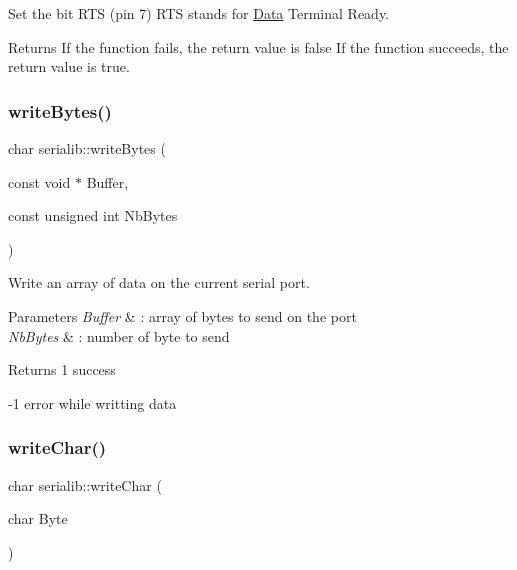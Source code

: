 Set the bit R\+TS (pin 7) R\+TS stands for \hyperlink{classData}{Data} Terminal Ready. 

\begin{DoxyReturn}{Returns}
If the function fails, the return value is false If the function succeeds, the return value is true. 
\end{DoxyReturn}
\mbox{\label{classserialib_aa14196b6f422584bf5eebc4ddb71d483}} 
\subsubsection{\texorpdfstring{write\+Bytes()}{writeBytes()}}
{\footnotesize\ttfamily char serialib\+::write\+Bytes (\begin{DoxyParamCaption}\item[{const void $\ast$}]{Buffer,  }\item[{const unsigned int}]{Nb\+Bytes }\end{DoxyParamCaption})}



Write an array of data on the current serial port. 


\begin{DoxyParams}{Parameters}
{\em Buffer} & \+: array of bytes to send on the port \\
\hline
{\em Nb\+Bytes} & \+: number of byte to send \\
\hline
\end{DoxyParams}
\begin{DoxyReturn}{Returns}
1 success 

-\/1 error while writting data 
\end{DoxyReturn}
\mbox{\label{classserialib_aa6d231cb99664a613bcb503830f73497}} 
\subsubsection{\texorpdfstring{write\+Char()}{writeChar()}}
{\footnotesize\ttfamily char serialib\+::write\+Char (\begin{DoxyParamCaption}\item[{char}]{Byte }\end{DoxyParamCaption})}



